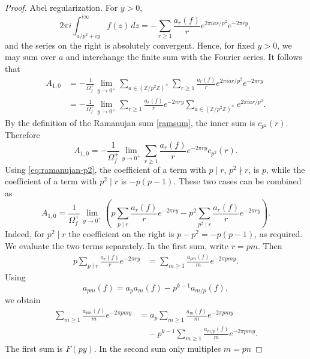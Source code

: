 \documentclass[10pt,a4paper]{amsart}
\newcommand{\Z}{\mathbb{Z}}
\begin{document}
\begin{proof}
Abel regularization.  For \(y>0\),
\[
        2\pi i
        \int_{a/p^2+iy}^{i\infty}f(z)\,dz
        =
        -\sum_{r\geq1}
        \frac{a_r(f)}{r}
        e^{2\pi i ar/p^2}e^{-2\pi ry},
\]
and the series on the right is absolutely convergent.  Hence, for
fixed \(y>0\), we may sum over \(a\) and interchange the finite sum
with the Fourier series.  It follows that
\[
\begin{aligned}
        A_{1,0}
        &=
        -\frac1{\Omega_f^+}
        \lim_{y\to0^+}
        \sum_{a\in(\Z/p^2\Z)^\times}
        \sum_{r\geq1}
        \frac{a_r(f)}{r}
        e^{2\pi i ar/p^2}e^{-2\pi ry} \\
        &=
        -\frac1{\Omega_f^+}
        \lim_{y\to0^+}
        \sum_{r\geq1}
        \frac{a_r(f)}{r}e^{-2\pi ry}
        \sum_{a\in(\Z/p^2\Z)^\times}
        e^{2\pi i ar/p^2}.
\end{aligned}
\]
By the definition of the Ramanujan sum \eqref{ramsum}, the inner sum is
\(c_{p^2}(r)\). Therefore
\[
        A_{1,0}
        =
        -\frac1{\Omega_f^+}
        \lim_{y\to0^+}
        \sum_{r\geq1}
        \frac{a_r(f)}r e^{-2\pi ry}c_{p^2}(r).
\]
Using \eqref{eq:ramanujan-p2}, the coefficient of a term with
\(p\mid r\), \(p^2\nmid r\), is \(p\), while the coefficient of a term
with \(p^2\mid r\) is \(-p(p-1)\). These two cases can be combined as
\[
        A_{1,0}
        =
        \frac1{\Omega_f^+}
        \lim_{y\to0^+}
        \left(
        p\sum_{p\mid r}
        \frac{a_r(f)}r e^{-2\pi ry}
        -
        p^2\sum_{p^2\mid r}
        \frac{a_r(f)}r e^{-2\pi ry}
        \right).
\]
Indeed, for \(p^2\mid r\) the coefficient on the right is
\(p-p^2=-p(p-1)\), as required. We evaluate the two terms separately. In the first sum, write \(r=pm\).
Then
\[
\begin{aligned}
        p\sum_{p\mid r}
        \frac{a_r(f)}r e^{-2\pi ry}
        &=
        \sum_{m\geq1}
        \frac{a_{pm}(f)}m e^{-2\pi pmy}.
\end{aligned}
\]
Using
\[
        a_{pm}(f)
        =
        a_pa_m(f)-p^{k-1}a_{m/p}(f),
\]
we obtain
\[
\begin{aligned}
        \sum_{m\geq1}
        \frac{a_{pm}(f)}m e^{-2\pi pmy}
        &=
        a_p
        \sum_{m\geq1}
        \frac{a_m(f)}m e^{-2\pi pmy}        \\
        &\quad
        -
        p^{k-1}
        \sum_{m\geq1}
        \frac{a_{m/p}(f)}m e^{-2\pi pmy}.
\end{aligned}
\]
The first sum is \(F(py)\). In the second sum only multiples \(m=pn\)

\end{proof}
\end{document}
